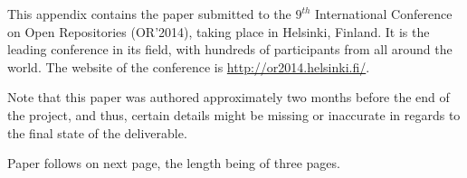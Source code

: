 
This appendix contains the paper submitted to the $9^{th}$ International Conference
on Open Repositories (OR'2014), taking place in Helsinki, Finland. It is the
leading conference in its field, with hundreds of participants from all around
the world. The website of the conference is
\url{http://or2014.helsinki.fi/}.

Note that this paper was authored approximately two months before the end of
the project, and thus, certain details might be missing or inaccurate in
regards to the final state of the deliverable.

Paper follows on next page, the length being of three pages.



